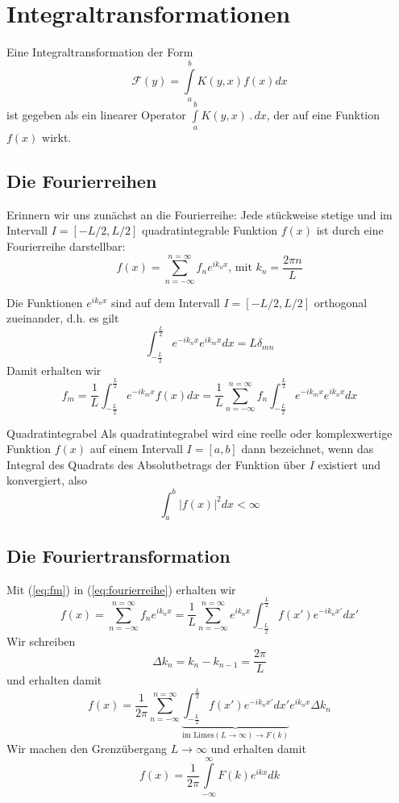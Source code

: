 \chapter{Integraltransformationen}
Eine Integraltransformation der Form
\begin{equation}
  \mathcal{F}(y)=\int\limits_a^bK(y,x)f(x)dx
  \label{eq:IntTrafo}
\end{equation}
ist gegeben als ein linearer Operator $\int\limits_a^bK(y,x)\,.\,dx$, der auf
eine Funktion $f(x)$ wirkt.
\section{Die Fourierreihen}
Erinnern wir uns zunächst an die Fourierreihe: Jede stückweise stetige und im
Intervall $I=[-L/2,L/2]$ quadratintegrable Funktion $f(x)$ ist durch eine
Fourierreihe darstellbar:
\begin{equation}\label{eq:fourierreihe}
f(x)=\sum_{n=-\infty}^{n=\infty}f_n e^{ik_n x}\mbox{, mit }k_n=\frac{2\pi n}{L}
\end{equation}

Die Funktionen $e^{ik_nx}$ sind auf dem Intervall $I=[-L/2,L/2]$ orthogonal zueinander, d.h.
es gilt
\[ \int_{-\frac{L}{2}}^{\frac{L}{2}}e^{-ik_nx}e^{ik_mx}dx=L\delta_{mn}\]
Damit erhalten wir 
\begin{equation}\label{eq:fm}
f_m=\frac{1}{L}\int_{-\frac{L}{2}}^{\frac{L}{2}}e^{-ik_mx}f(x)dx=\frac{1}{L}
\sum_{n=-\infty}^{n=\infty}f_n\int_{-\frac{L}{2}}^{\frac{L}{2}}e^{-ik_mx}e^{ik_nx}dx
\end{equation}
\begin{note}{Quadratintegrabel}
Als quadratintegrabel wird eine reelle oder komplexwertige Funktion $f(x)$ auf
einem Intervall $I=[a,b]$ dann bezeichnet, wenn das Integral des Quadrats des
Absolutbetrags der Funktion über $I$ existiert und konvergiert, also
\[\int_a^b |f(x)|^2dx<\infty\]
\end{note}
%
\section{Die Fouriertransformation}
Mit (\ref{eq:fm}) in (\ref{eq:fourierreihe}) erhalten wir
\begin{equation}
f(x)=\sum_{n=-\infty}^{n=\infty}f_n e^{ik_n x}=\frac{1}{L}\sum_{n=-\infty}^{n=\infty}
e^{ik_nx}\int_{-\frac{L}{2}}^{\frac{L}{2}}f(x') e^{-ik_nx'}dx'
\end{equation}
Wir schreiben
\[
\Delta k_n=k_n-k_{n-1}=\frac{2\pi}{L}
\]
und erhalten damit
\[
f(x)=\frac{1}{2\pi}\sum_{n=-\infty}^{n=\infty}
\underbrace{\int_{-\frac{L}{2}}^{\frac{L}{2}}f(x') e^{-ik_nx'}dx'}_{\mbox{im Limes} (L\rightarrow\infty)\rightarrow F(k)}
e^{ik_nx}\Delta k_n
\]
Wir machen den Grenzübergang $L\rightarrow\infty$ und erhalten damit
\[
f(x)=\frac{1}{2\pi}\int\limits_{-\infty}^{\infty}F(k) e^{ikx}dk
\]

